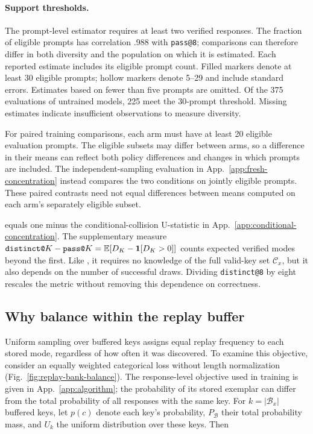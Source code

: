 \paragraph{Support thresholds.}
\label{app:registered-endpoints}
The prompt-level \pmd{} estimator requires at least two verified responses.
The fraction of eligible prompts has correlation .988 with
\texttt{pass@8}; comparisons can therefore differ in both diversity and the
population on which it is estimated. Each reported estimate includes its
eligible prompt count. Filled markers denote at least 30 eligible prompts;
hollow markers denote 5--29 and include standard errors. Estimates based on
fewer than five prompts are omitted. Of the 375 evaluations of
untrained models, 225 meet the 30-prompt threshold. Missing
estimates indicate insufficient observations to measure diversity.

For paired training comparisons, each arm must have at least 20 eligible
evaluation prompts. The eligible subsets may differ between arms, so a
difference in their means can reflect both policy differences and changes in
which prompts are included. The independent-sampling evaluation in
App.~\ref{app:fresh-concentration} instead compares the two conditions on
jointly eligible prompts. These paired contrasts need not equal differences
between means computed on each arm's separately eligible subset.

\pmd{} equals one minus the conditional-collision U-statistic in
App.~\ref{app:conditional-concentration}. The supplementary measure
$\texttt{distinct@}K-\texttt{pass@}K=\mathbb E[D_K-\mathbf 1[D_K>0]]$ counts expected
verified modes beyond the first. Like \pmd{}, it requires no knowledge of
the full valid-key set $\mathcal C_x$, but it also depends on the number of
successful draws. Dividing \texttt{distinct@8} by eight rescales the metric
without removing this dependence on correctness.

\subsection{Why balance within the replay buffer}
\label{app:replay-metric-alignment}

Uniform sampling over buffered keys assigns equal replay frequency to each
stored mode, regardless of how often it was discovered. To examine this
objective, consider an equally weighted categorical loss without length
normalization (Fig.~\ref{fig:replay-bank-balance}). The response-level
objective used in training is given in App.~\ref{app:algorithm}; the
probability of its stored exemplar can differ from the total probability of
all responses with the same key. For $k=|\mathcal B_x|$ buffered keys, let
$p(c)$ denote each key's probability, $P_{\mathcal B}$ their total probability
mass, and $U_k$ the uniform distribution over these keys. Then


